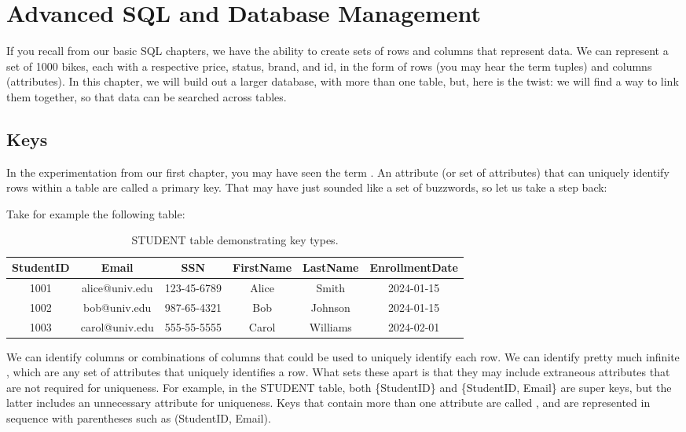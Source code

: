 \chapter{Advanced SQL and Database Management}

If you recall from our basic SQL chapters, we have the ability to create sets of rows and columns that represent data. We can represent a set of 1000 bikes, each with a respective price, status, brand, and id, in the form of rows (you may hear the term tuples) and columns (attributes). In this chapter, we will build out a larger database, with more than one table, but, here is the twist: we will find a way to link them together, so that data can be searched across tables. 


\section{Keys}
In the experimentation from our first chapter, you may have seen the term . An attribute (or set of attributes) that can uniquely identify rows within a table are called a primary key. That may have just sounded like a set of buzzwords, so let us take a step back:

Take for example the following table:
\begin{table}[h]
\centering
\begin{tabular}{|c|c|c|c|c|c|}
\hline
\textbf{StudentID} & \textbf{Email} & \textbf{SSN} & FirstName & LastName & EnrollmentDate \\
\hline
1001 & \textsf{alice@univ.edu} & 123-45-6789 & Alice & Smith & 2024-01-15 \\
\hline
1002 & \textsf{bob@univ.edu} & 987-65-4321 & Bob & Johnson & 2024-01-15 \\
\hline
1003 & \textsf{carol@univ.edu} & 555-55-5555 & Carol & Williams & 2024-02-01 \\
\hline
\end{tabular}
\caption{STUDENT table demonstrating key types.}
\label{tab:keys}
\end{table}

We can identify columns or combinations of columns that could be used to uniquely identify each row. We can identify pretty much infinite , which are any set of attributes that uniquely identifies a row. What sets these apart is that they may include extraneous attributes that are not required for uniqueness. For example, in the STUDENT table, both \{StudentID\} and \{StudentID, Email\} are super keys, but the latter includes an unnecessary attribute for uniqueness. Keys that contain more than one attribute are called , and are represented in sequence with parentheses such as (StudentID, Email).

